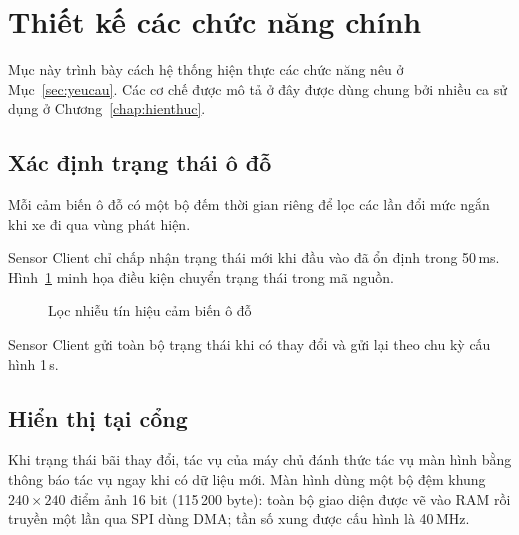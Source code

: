\section{Thiết kế các chức năng chính}\label{sec:chucnang}
Mục này trình bày cách hệ thống hiện thực các chức năng nêu ở Mục~\ref{sec:yeucau}. Các cơ chế
được mô tả ở đây được dùng chung bởi nhiều ca sử dụng ở Chương~\ref{chap:hienthuc}.

\subsection{Xác định trạng thái ô đỗ}\label{sec:f-slot}
Mỗi cảm biến ô đỗ có một bộ đếm thời gian riêng để lọc các lần đổi mức ngắn khi xe đi qua vùng phát hiện.

Sensor Client chỉ chấp nhận trạng thái mới khi đầu vào đã ổn định trong 50\,ms. Hình~\ref{fig:debounce} minh họa điều kiện chuyển trạng thái trong mã nguồn.

\begin{figure}[!htb]
\centering
{}
\caption{Lọc nhiễu tín hiệu cảm biến ô đỗ}\label{fig:debounce}
\end{figure}

Sensor Client gửi toàn bộ trạng thái khi có thay đổi và gửi lại theo chu kỳ cấu hình 1\,s.

\subsection{Hiển thị tại cổng}\label{sec:f-tft}
Khi trạng thái bãi thay đổi, tác vụ  của máy chủ đánh thức tác vụ màn hình bằng thông báo tác vụ
ngay khi có dữ liệu mới. Màn hình dùng một bộ đệm khung $240\times240$ điểm ảnh 16 bit
(115\,200 byte): toàn bộ giao diện được vẽ vào RAM rồi truyền một lần qua SPI dùng DMA; tần số xung được cấu hình là 40\,MHz.

